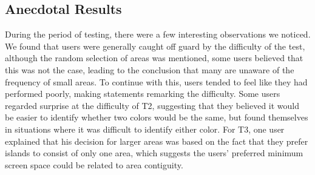 \subsection{Anecdotal Results}
During the period of testing, there were a few interesting observations we noticed. We found that users were generally caught off guard by the difficulty of the test, although the random selection of areas was mentioned, some users believed that this was not the case, leading to the conclusion that many are unaware of the frequency of small areas. To continue with this, users tended to feel like they had performed poorly, making statements remarking the difficulty. Some users regarded surprise at the difficulty of T2, suggesting that they believed it would be easier to identify whether two colors would be the same, but found themselves in situations where it was difficult to identify either color. For T3, one user explained that his decision for larger areas was based on the fact that they prefer islands to consist of only one area, which suggests the users' preferred minimum screen space could be related to area contiguity.



